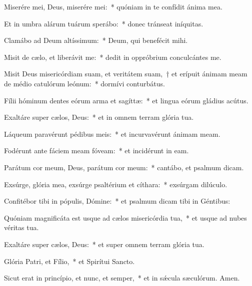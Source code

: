 \item Miserére mei, Deus, miserére mei:~* quóniam in te confídit ánima mea.

\item Et in umbra alárum tuárum sperábo:~* donec tránseat iníquitas.

\item Clamábo ad Deum altíssimum:~* Deum, qui benefécit mihi.

\item Misit de cælo, et liberávit me:~* dedit in oppróbrium conculcántes me.

\item Misit Deus misericórdiam suam, et veritátem suam,~† et erípuit ánimam meam de médio catulórum leónum:~* dormívi conturbátus.

\item Fílii hóminum dentes eórum arma et sagíttæ:~* et lingua eórum gládius acútus.

\item Exaltáre super cælos, Deus:~* et in omnem terram glória tua.

\item Láqueum paravérunt pédibus meis:~* et incurvavérunt ánimam meam.

\item Fodérunt ante fáciem meam fóveam:~* et incidérunt in eam.

\item Parátum cor meum, Deus, parátum cor meum:~* cantábo, et psalmum dicam.

\item Exsúrge, glória mea, exsúrge psaltérium et cíthara:~* exsúrgam dilúculo.

\item Confitébor tibi in pópulis, Dómine:~* et psalmum dicam tibi in Géntibus:

\item Quóniam magnificáta est usque ad cælos misericórdia tua,~* et usque ad nubes véritas tua.

\item Exaltáre super cælos, Deus:~* et super omnem terram glória tua.

\item Glória Patri, et Fílio,~* et Spirítui Sancto.

\item Sicut erat in princípio, et nunc, et semper,~* et in sǽcula sæculórum. Amen.

